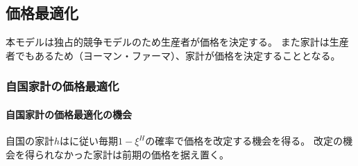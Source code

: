 
\subsection{価格最適化}
\label{sec:chapter3_assumptions_price_optimization}
本モデルは独占的競争モデルのため生産者が価格を決定する。
また家計は生産者でもあるため（ヨーマン・ファーマ）、家計が価格を決定することとなる。

\subsubsection{自国家計の価格最適化}
\label{sec:chapter3_assumptions_price_optimization_home}

\paragraph{自国家計の価格最適化の機会}
\label{sec:chapter3_assumptions_price_optimization_home_opportunity}
自国の家計\(h\)は\textcite{Calvo1983}に従い毎期\(1-\xi^H\)の確率で価格を改定する機会を得る。
改定の機会を得られなかった家計は前期の価格を据え置く。

